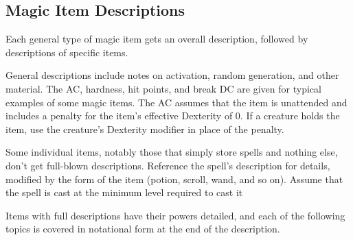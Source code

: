 \subsection{Magic Item Descriptions}

Each general type of magic item gets an overall description, followed by descriptions of specific items.

General descriptions include notes on activation, random generation, and other material. The AC, hardness, hit points, and break DC are given for typical examples of some magic items. The AC assumes that the item is unattended and includes a  penalty for the item's effective Dexterity of 0. If a creature holds the item, use the creature's Dexterity modifier in place of the  penalty.

Some individual items, notably those that simply store spells and nothing else, don't get full-blown descriptions. Reference the spell's description for details, modified by the form of the item (potion, scroll, wand, and so on). Assume that the spell is cast at the minimum level required to cast it

Items with full descriptions have their powers detailed, and each of the following topics is covered in notational form at the end of the description.

